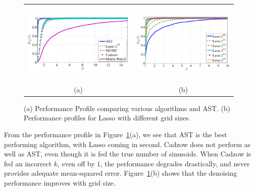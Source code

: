 \begin{figure}[htp]
\centering
\begin{tabular}{cc}
	\includegraphics[height=40mm]{figures/performance_profile_randamp_color} &
	\includegraphics[trim=0mm 0mm 2mm 5mm,clip,height=40mm]{figures/performance_profile_lasso_randamp_color}\\
(a) & (b)
\end{tabular}
\caption{ (a) Performance Profile  comparing various algorithms and AST. (b) Performance profiles for Lasso with different grid sizes.}
\label{fig:pp}
\end{figure}


From the performance profile in Figure~\ref{fig:pp}(a), we see that AST is the
best performing algorithm, with Lasso coming in
second. Cadzow does not perform as well as AST, even though it is fed the true
number of sinusoids. When Cadzow is fed an incorrect $k$, even off by $1$, the
performance degrades drastically, and never provides adequate mean-squared
error. Figure~\ref{fig:pp}(b) shows that the denoising performance
improves  with grid size.

